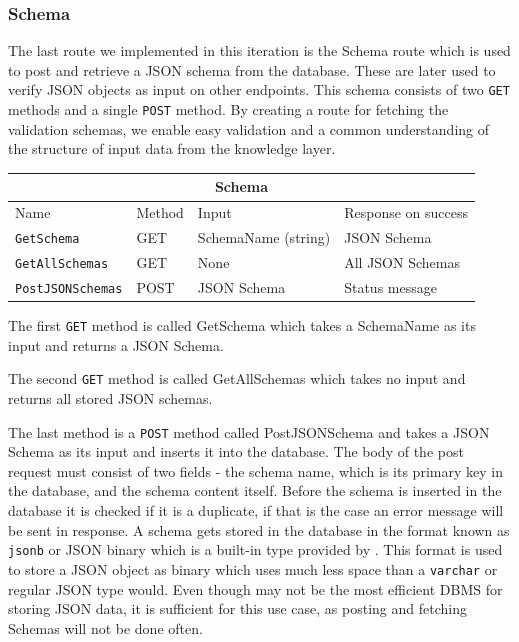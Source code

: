 \subsubsection{Schema}
The last route we implemented in this iteration is the Schema route which is used to post and retrieve a JSON schema from the database. These are later used to verify JSON objects as input on other endpoints. 
This schema consists of two \texttt{GET} methods and a single \texttt{POST} method.
By creating a route for fetching the validation schemas, we enable easy validation and a common understanding of the structure of input data from the knowledge layer.
\begin{table}[h]
    \begin{tabular}{|llll|}
    \hline
    \multicolumn{4}{|c|}{\textbf{Schema}}                                                                                                     \\ \hline
    \multicolumn{1}{|l|}{Name}                     & \multicolumn{1}{l|}{Method} & \multicolumn{1}{l|}{Input}               & Response on success \\ \hline
    \multicolumn{1}{|l|}{\texttt{GetSchema}}       & \multicolumn{1}{l|}{GET}    & \multicolumn{1}{l|}{SchemaName (string)} & JSON Schema         \\ \hline
    \multicolumn{1}{|l|}{\texttt{GetAllSchemas}}   & \multicolumn{1}{l|}{GET}    & \multicolumn{1}{l|}{None}                & All JSON Schemas    \\ \hline
    \multicolumn{1}{|l|}{\texttt{PostJSONSchemas}} & \multicolumn{1}{l|}{POST}   & \multicolumn{1}{l|}{JSON Schema}         & Status message      \\ \hline
    \end{tabular}
\end{table}

The first \texttt{GET} method is called GetSchema which takes a SchemaName as its input and returns a JSON Schema. 

The second \texttt{GET} method is called GetAllSchemas which takes no input and returns all stored JSON schemas. 

The last method is a \texttt{POST} method called PostJSONSchema and takes a JSON Schema as its input and inserts it into the database.
The body of the post request must consist of two fields - the schema name, which is its primary key in the database, and the schema content itself. Before the schema is inserted in the database it is checked if it is a duplicate, if that is the case an error message will be sent in response.
A schema gets stored in the database in the format known as \texttt{jsonb} or JSON binary which is a built-in type provided by \postgres{}.
This format is used to store a JSON object as binary which uses much less space than a \texttt{varchar} or regular JSON type would.
Even though \postgres{} may not be the most efficient DBMS for storing JSON data, it is sufficient for this use case, as posting and fetching Schemas will not be done often. 